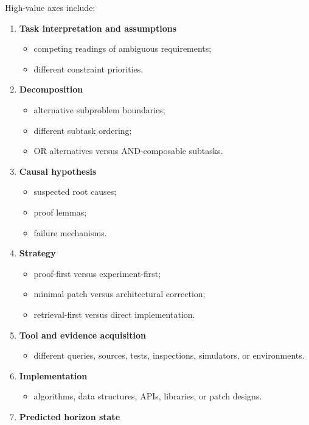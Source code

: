 \documentclass[
  letterpaper,
]{article}
\providecommand{\tightlist}{%
  \setlength{\itemsep}{0pt}\setlength{\parskip}{0pt}}
\begin{document}
High-value axes include:

\begin{enumerate}
\def\labelenumi{\arabic{enumi}.}
\tightlist
\item
  \textbf{Task interpretation and assumptions}

  \begin{itemize}
  \tightlist
  \item
    competing readings of ambiguous requirements;
  \item
    different constraint priorities.
  \end{itemize}
\item
  \textbf{Decomposition}

  \begin{itemize}
  \tightlist
  \item
    alternative subproblem boundaries;
  \item
    different subtask ordering;
  \item
    OR alternatives versus AND-composable subtasks.
  \end{itemize}
\item
  \textbf{Causal hypothesis}

  \begin{itemize}
  \tightlist
  \item
    suspected root causes;
  \item
    proof lemmas;
  \item
    failure mechanisms.
  \end{itemize}
\item
  \textbf{Strategy}

  \begin{itemize}
  \tightlist
  \item
    proof-first versus experiment-first;
  \item
    minimal patch versus architectural correction;
  \item
    retrieval-first versus direct implementation.
  \end{itemize}
\item
  \textbf{Tool and evidence acquisition}

  \begin{itemize}
  \tightlist
  \item
    different queries, sources, tests, inspections, simulators, or environments.
  \end{itemize}
\item
  \textbf{Implementation}

  \begin{itemize}
  \tightlist
  \item
    algorithms, data structures, APIs, libraries, or patch designs.
  \end{itemize}
\item
  \textbf{Predicted horizon state}


\end{enumerate}
\end{document}
